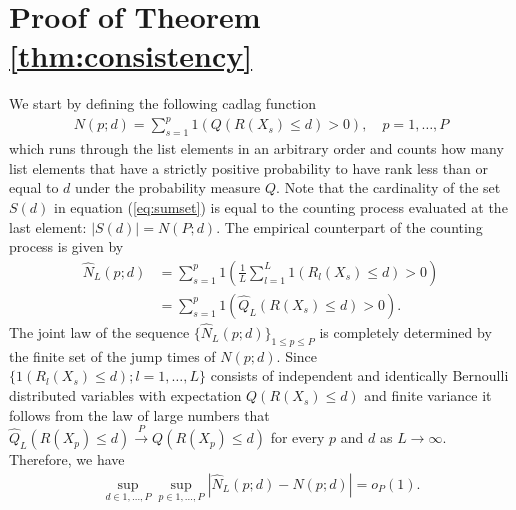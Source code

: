 \documentclass[12pt,a4paper]{article}
\newcommand{\nn}{\nonumber}
\theoremstyle{plain}
\begin{document}
%



\appendix

\newpage
\section{Proof of Theorem \ref{thm:consistency}}
\label{sec:appA}

We start by defining the following cadlag function
\begin{align}
  N(p; d) = \sum_{s=1}^p 1\left(Q(R(X_s) \leq d) > 0\right), \quad p = 1,\ldots, P
\end{align}
which runs through the list elements in an arbitrary order and counts
how many list elements that have a strictly positive probability to have
rank less than or equal to $d$ under the probability measure $Q$.
Note that the cardinality of the set $S(d)$ in equation
(\ref{eq:sumset}) is equal to the counting process evaluated at the last element: $|S(d)| = N(P;d)$.
The empirical counterpart of the counting process is given by
\begin{align}
  \widehat{N}_L(p; d) &= \sum_{s=1}^p 1\left( \frac{1}{L} \sum_{l=1}^L 1(R_l(X_s) \leq d) > 0\right)\\
        &= \sum_{s=1}^p 1\left(\widehat{Q}_L(R(X_s) \leq d) > 0\right)\nn.
\end{align}
The joint law of the sequence
$\{\widehat{N}_L(p;d)\}_{1\leq p \leq P}$ is completely determined by
the finite set of the jump times of $N(p;d)$. Since
$\{1(R_l(X_s) \leq d); l=1,\dots, L\}$ consists of independent and
identically Bernoulli distributed variables with expectation
$Q(R(X_s) \leq d)$ and finite variance it follows from the law of large numbers that
$\widehat{Q}_L(R(X_p) \leq d) \overset{P}{\longrightarrow} Q(R(X_p)
\leq d)$ for every $p$ and $d$ as $L \rightarrow \infty$. 
Therefore, we have
\begin{align}
  \sup_{d \in 1,\ldots,P}\sup_{p \in 1,\ldots, P} \left|\widehat{N}_L(p; d) - N(p; d)\right| = o_P(1).\label{eq:countingConv}
\end{align}
\end{document}
